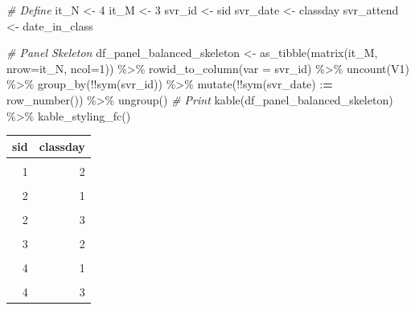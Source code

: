 \documentclass[
]{book}
\newenvironment{Shaded}{\begin{snugshade}}{\end{snugshade}}
\newcommand{\AttributeTok}[1]{\textcolor[rgb]{0.77,0.63,0.00}{#1}}
\newcommand{\CommentTok}[1]{\textcolor[rgb]{0.56,0.35,0.01}{\textit{#1}}}
\newcommand{\DecValTok}[1]{\textcolor[rgb]{0.00,0.00,0.81}{#1}}
\newcommand{\ErrorTok}[1]{\textcolor[rgb]{0.64,0.00,0.00}{\textbf{#1}}}
\newcommand{\FunctionTok}[1]{\textcolor[rgb]{0.00,0.00,0.00}{#1}}
\newcommand{\NormalTok}[1]{#1}
\newcommand{\OtherTok}[1]{\textcolor[rgb]{0.56,0.35,0.01}{#1}}
\newcommand{\SpecialCharTok}[1]{\textcolor[rgb]{0.00,0.00,0.00}{#1}}
\newcommand{\StringTok}[1]{\textcolor[rgb]{0.31,0.60,0.02}{#1}}
\begin{document}
\begin{Shaded}
\begin{Highlighting}[]
\CommentTok{\# Define}
\NormalTok{it\_N }\OtherTok{\textless{}{-}} \DecValTok{4}
\NormalTok{it\_M }\OtherTok{\textless{}{-}} \DecValTok{3}
\NormalTok{svr\_id }\OtherTok{\textless{}{-}} \StringTok{\textquotesingle{}sid\textquotesingle{}}
\NormalTok{svr\_date }\OtherTok{\textless{}{-}} \StringTok{\textquotesingle{}classday\textquotesingle{}}
\NormalTok{svr\_attend }\OtherTok{\textless{}{-}} \StringTok{\textquotesingle{}date\_in\_class\textquotesingle{}}

\CommentTok{\# Panel Skeleton}
\NormalTok{df\_panel\_balanced\_skeleton }\OtherTok{\textless{}{-}} \FunctionTok{as\_tibble}\NormalTok{(}\FunctionTok{matrix}\NormalTok{(it\_M, }\AttributeTok{nrow=}\NormalTok{it\_N, }\AttributeTok{ncol=}\DecValTok{1}\NormalTok{)) }\SpecialCharTok{\%\textgreater{}\%}
  \FunctionTok{rowid\_to\_column}\NormalTok{(}\AttributeTok{var =}\NormalTok{ svr\_id) }\SpecialCharTok{\%\textgreater{}\%}
  \FunctionTok{uncount}\NormalTok{(V1) }\SpecialCharTok{\%\textgreater{}\%}
  \FunctionTok{group\_by}\NormalTok{(}\SpecialCharTok{!!}\FunctionTok{sym}\NormalTok{(svr\_id)) }\SpecialCharTok{\%\textgreater{}\%} \FunctionTok{mutate}\NormalTok{(}\SpecialCharTok{!!}\FunctionTok{sym}\NormalTok{(svr\_date) }\SpecialCharTok{:}\ErrorTok{=} \FunctionTok{row\_number}\NormalTok{()) }\SpecialCharTok{\%\textgreater{}\%}
  \FunctionTok{ungroup}\NormalTok{()}
\CommentTok{\# Print}
\FunctionTok{kable}\NormalTok{(df\_panel\_balanced\_skeleton) }\SpecialCharTok{\%\textgreater{}\%}
  \FunctionTok{kable\_styling\_fc}\NormalTok{()}
\end{Highlighting}
\end{Shaded}

\begin{table}[!h]
\centering
\begin{tabular}{r|r}
\hline
sid & classday\\
\hline
\cellcolor{gray!6}{1} & \cellcolor{gray!6}{1}\\
\hline
1 & 2\\
\hline
\cellcolor{gray!6}{1} & \cellcolor{gray!6}{3}\\
\hline
2 & 1\\
\hline
\cellcolor{gray!6}{2} & \cellcolor{gray!6}{2}\\
\hline
2 & 3\\
\hline
\cellcolor{gray!6}{3} & \cellcolor{gray!6}{1}\\
\hline
3 & 2\\
\hline
\cellcolor{gray!6}{3} & \cellcolor{gray!6}{3}\\
\hline
4 & 1\\
\hline
\cellcolor{gray!6}{4} & \cellcolor{gray!6}{2}\\
\hline
4 & 3\\
\hline
\end{tabular}
\end{table}
\end{document}
